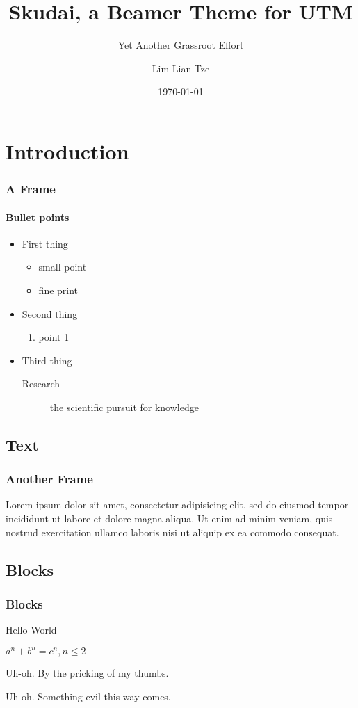 \documentclass{beamer}
\title{Skudai, a Beamer Theme for UTM}
\subtitle{Yet Another Grassroot Effort}
\author{Lim Lian Tze}
\date{\today}
\institute{\url{liantze@gmail.com}\\\url{http://liantze.penguinattack.org/}}
\begin{document}
\begin{frame}[t]
\titlepage
\end{frame}


\section{Introduction}
\begin{frame}
\frametitle{A Frame}
\framesubtitle{Bullet points}
\begin{itemize}
\item First thing
	\begin{itemize}
	\item small point
	\item fine print
	\end{itemize}
\item Second thing
	\begin{enumerate}
	\item point 1
	\end{enumerate}
\item Third thing
	\begin{description}
	\item[Research] the scientific pursuit for knowledge
	\end{description}
\end{itemize}
\end{frame}

\subsection{Text}
\begin{frame}
\frametitle{Another Frame}
Lorem ipsum dolor sit amet, consectetur adipisicing elit, sed do eiusmod tempor incididunt ut labore et dolore magna aliqua. Ut enim ad minim veniam, quis nostrud exercitation ullamco laboris nisi ut aliquip ex ea commodo consequat.
\end{frame}

\subsection{Blocks}
\begin{frame}
\frametitle{Blocks}
\begin{definition}[Greetings]
Hello World
\end{definition}

\begin{theorem}
$a^n + b^n = c^n, n \leq 2$
\end{theorem}

\begin{alertblock}{Uh-oh.}
By the pricking of my thumbs.
\end{alertblock}

\begin{exampleblock}{Uh-oh.}
Something evil this way comes.
\end{exampleblock}

\end{frame}
\end{document}
